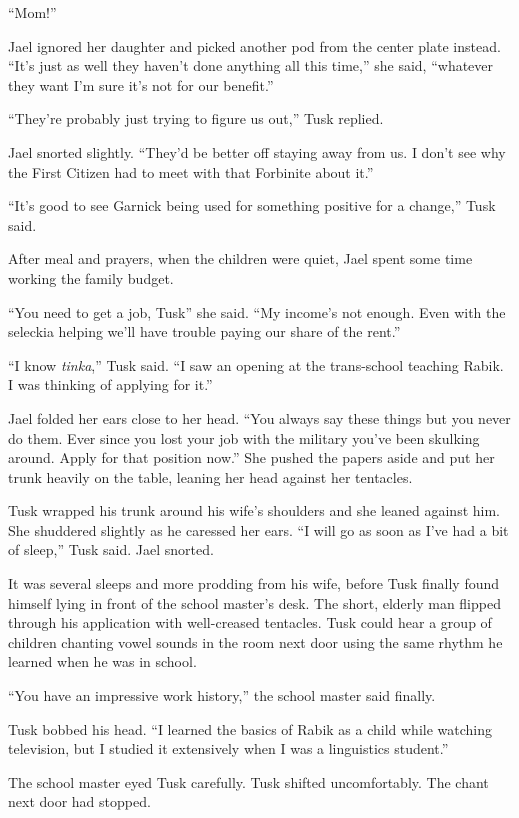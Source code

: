 ``Mom!''

Jael ignored her daughter and picked another pod from the center plate instead. ``It's just as
well they haven't done anything all this time,'' she said, ``whatever they want I'm sure it's
not for our benefit.''

``They're probably just trying to figure us out,'' Tusk replied.

Jael snorted slightly. ``They'd be better off staying away from us. I don't see why the First
Citizen had to meet with that Forbinite about it.''

``It's good to see Garnick being used for something positive for a change,'' Tusk said.

After meal and prayers, when the children were quiet, Jael spent some time working the family
budget.

``You need to get a job, Tusk'' she said. ``My income's not enough. Even with the seleckia
helping we'll have trouble paying our share of the rent.''

``I know \textit{tinka},'' Tusk said. ``I saw an opening at the trans-school teaching Rabik. I
was thinking of applying for it.''

Jael folded her ears close to her head. ``You always say these things but you never do them.
Ever since you lost your job with the military you've been skulking around. Apply for that
position now.'' She pushed the papers aside and put her trunk heavily on the table, leaning her
head against her tentacles.

Tusk wrapped his trunk around his wife's shoulders and she leaned against him. She shuddered
slightly as he caressed her ears. ``I will go as soon as I've had a bit of sleep,'' Tusk said.
Jael snorted.

It was several sleeps and more prodding from his wife, before Tusk finally found himself lying
in front of the school master's desk. The short, elderly man flipped through his application
with well-creased tentacles. Tusk could hear a group of children chanting vowel sounds in the
room next door using the same rhythm he learned when he was in school.

``You have an impressive work history,'' the school master said finally.

Tusk bobbed his head. ``I learned the basics of Rabik as a child while watching television, but
I studied it extensively when I was a linguistics student.''

The school master eyed Tusk carefully. Tusk shifted uncomfortably. The chant next door had
stopped.

